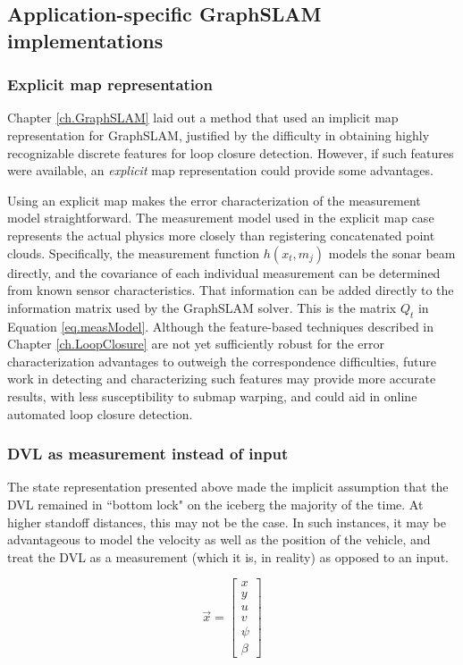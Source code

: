 \subsection{Application-specific GraphSLAM implementations}
\label{sec.DesignConsiderations}
\subsubsection{Explicit map representation}

Chapter \ref{ch.GraphSLAM} laid out a method that used an implicit map representation for GraphSLAM, justified by the difficulty in obtaining highly recognizable discrete features for loop closure detection. However, if such features were available, an \emph{explicit} map representation could provide some advantages. 

Using an explicit map makes the error characterization of the measurement model straightforward. The measurement model used in the explicit map case represents the actual physics more closely than registering concatenated point clouds. Specifically, the measurement function $h\left(x_t,m_j\right)$ models the sonar beam directly, and the covariance of each individual measurement can be determined from known sensor characteristics. That information can be added directly to the information matrix used by the GraphSLAM solver. This is the matrix $Q_t$ in Equation \ref{eq.measModel}. Although the feature-based techniques described in Chapter \ref{ch.LoopClosure} are not yet sufficiently robust for the error characterization advantages to outweigh the correspondence difficulties, future work in detecting and characterizing such features may provide more accurate results, with less susceptibility to submap warping, and could aid in online automated loop closure detection. 

\subsubsection{DVL as measurement instead of input}
\label{sec.VelocityState}

The state representation presented above made the implicit assumption that the DVL remained in ``bottom lock" on the iceberg the majority of the time. At higher standoff distances, this may not be the case. In such instances, it may be advantageous to model the velocity as well as the position of the vehicle, and treat the DVL as a measurement (which it is, in reality) as opposed to an input.

\begin{equation}
\label{eq.altState}
\vec{x}= \left[\begin{array}{c}
                     x \\ y \\ u \\ v \\ \psi \\ \beta 
                     \end{array}\right]
\end{equation}

